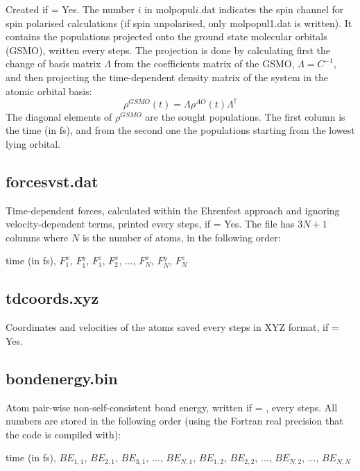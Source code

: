 Created if  = Yes. The number $i$ in molpopul$i$.dat
indicates the spin channel for spin polarised calculations (if spin
unpolarised, only molpopul1.dat is written). It contains the
populations projected onto the ground state molecular orbitals (GSMO),
written every  steps. The projection is done by
calculating first the change of basis matrix $\Lambda$ from the
coefficients matrix of the GSMO, $\Lambda = C^{-1}$, and then
projecting the time-dependent density matrix of the system in the
atomic orbital basis:
\begin{equation*}
  \rho^{GSMO}(t) = \Lambda \rho^{AO}(t) \Lambda^{\dagger}
\end{equation*}
The diagonal elements of $\rho^{GSMO}$ are the sought populations. The first
column is the time (in fs), and from the second one the populations starting
from the lowest lying orbital.

\subsection{forcesvst.dat}

Time-dependent forces, calculated within the Ehrenfest approach and
ignoring velocity-dependent terms, printed every 
steps, if  = Yes. The file has $3N +1$ columns where $N$ is
the number of atoms, in the following order:

time (in fs), $F_1^x$, $F_1^y$, $F_1^z$, $F_2^x$, $\dots$, $F_N^x$,
$F_N^y$, $F_N^z$

\subsection{tdcoords.xyz}

Coordinates and velocities of the atoms saved every
 steps in XYZ format, if  = Yes.

\subsection{bondenergy.bin}
\label{sec:beformatout}

Atom pair-wise non-self-consistent bond energy, written if 
= , every  steps. All numbers are stored in the
following order (using the Fortran real precision that the code is compiled
with):

time (in fs), $BE_{1,1}$, $BE_{2,1}$, $BE_{3,1}$, $\dots$, $BE_{N,1}$,
$BE_{1,2}$, $BE_{2,2}$, $\dots$, $BE_{N,2}$, $\dots$, $BE_{N,N}$

